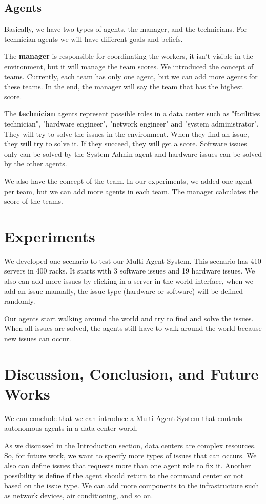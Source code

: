 \documentclass[letterpaper]{article}
\begin{document}
\subsection{Agents}

Basically, we have two types of agents, the manager, and the technicians. For technician agents we will have different goals and beliefs.

The \textbf{manager} is responsible for coordinating the workers, it isn't visible in the environment, but it will manage the team scores. We introduced the concept of teams. Currently, each team has only one agent, but we can add more agents for these teams. In the end, the manager will say the team that has the highest score.

The \textbf{technician} agents represent possible roles in a data center such as "facilities technician", "hardware engineer", "network engineer" and "system administrator". They will try to solve the issues in the environment. When they find an issue, they will try to solve it. If they succeed, they will get a score. Software issues only can be solved by the System Admin agent and hardware issues can be solved by the other agents.

We also have the concept of the team. In our experiments, we added one agent per team, but we can add more agents in each team. The manager calculates the score of the teams.

\section{Experiments}\label{sec:experiments}

We developed one scenario to test our Multi-Agent System. This scenario has 410 servers in 400 racks. It starts with 3 software issues and 19 hardware issues. We also can add more issues by clicking in a server in the world interface, when we add an issue manually, the issue type (hardware or software) will be defined randomly.

Our agents start walking around the world and try to find and solve the issues. When all issues are solved, the agents still have to walk around the world because new issues can occur.

\section{Discussion, Conclusion, and Future Works}\label{sec:conclusions}

We can conclude that we can introduce a Multi-Agent System that controls autonomous agents in a data center world.

As we discussed in the Introduction section, data centers are complex resources. So, for future work, we want to specify more types of issues that can occurs. We also can define issues that requests more than one agent role to fix it. Another possibility is define if the agent should return to the command center or not based on the issue type. We can add more components to the infrastructure such as network devices, air conditioning, and so on.



\end{document}
